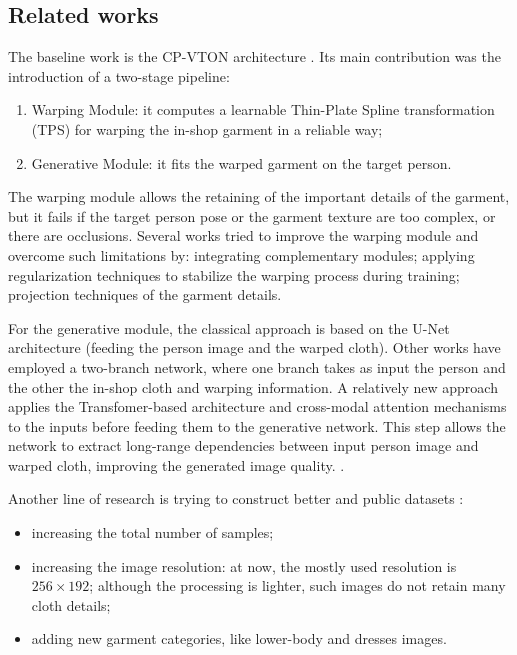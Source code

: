 \subsection{Related works}
The baseline work is the CP-VTON architecture \cite{CP-VTON}. Its main contribution was the introduction of a two-stage pipeline:
\begin{enumerate}[noitemsep]
\item Warping Module: it computes a learnable Thin-Plate Spline transformation (TPS) for warping the in-shop garment in a reliable way;
\item Generative Module: it fits the warped garment on the target person.
\end{enumerate}

The warping module allows the retaining of the important details of the garment, but it fails if the target person pose or the garment texture are too complex, or there are occlusions.
Several works tried to improve the warping module and overcome such limitations by: integrating complementary modules; applying regularization techniques to stabilize the warping process during training; projection techniques of the garment details.

For the generative module, the classical approach is based on the U-Net architecture (feeding the person image and the warped cloth).
Other works have employed a two-branch network, where one branch takes as input the person and the other the in-shop cloth and warping information.
A relatively new approach applies the Transfomer-based architecture and cross-modal attention mechanisms to the inputs before feeding them to the generative network. This step allows the network to extract long-range dependencies between input person image and warped cloth, improving the generated image quality. \cite{CIT}\cite{dual-branch}. 

Another line of research is trying to construct better and public datasets \cite{dress-code}:
\begin{itemize}[noitemsep]
\item increasing the total number of samples;
\item increasing the image resolution: at now, the mostly used resolution is $256 \times 192$; although the processing is lighter, such images do not retain many cloth details;
\item adding new garment categories, like lower-body and dresses images.
\end{itemize}


